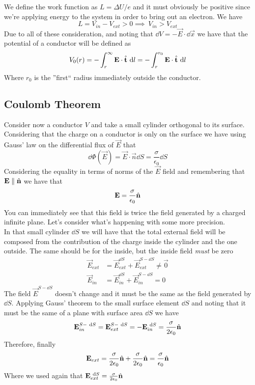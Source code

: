 \documentclass[../electromagnetism]{subfiles}
\begin{document}
We define the work function as $L=\Delta U/e$ and it must obviously be positive since we're applying energy to the system in order to bring out an electron. We have
\begin{equation}
	L=V_{in}-V_{ext}>0\implies\ V_{in}>V_{ext}
	\label{eq:potcond}
\end{equation}
Due to all of these consideration, and noting that $\dd V=-\vec{E}\cdot\dd\vec{x}$ we have that the potential of a conductor will be defined as
\begin{equation}
	V_0(r)=-\int_{r}^{\infty}\mathbf{E}\cdot\hat{\mathbf{t}}\ \mathrm{d} l=-\int_{r}^{r_0}\mathbf{E}\cdot\hat{\mathbf{t}}\ \mathrm{d} l
	\label{eq:potentialcond}
\end{equation}
Where $r_0$ is the ''first`` radius immediately outside the conductor.\\
\subsection{Coulomb Theorem}
Consider now a conductor $V$ and take a small cylinder orthogonal to its surface. Considering that the charge on a conductor is only on the surface we have using Gauss' law on the differential flux of $\vec{E}$ that
\begin{equation}
	\dd\Phi(\vec{E})=\vec{E}\cdot\vec{n}\dd S=\frac{\sigma}{\epsilon_0}\dd S
	\label{eq:glcondsur}
\end{equation}
Considering the equality in terms of norms of the $\vec{E}$ field and remembering that $\mathbf{E}\parallel\hat{\mathbf{n}}$ we have that
\begin{equation}
	\mathbf{E}=\frac{\sigma}{\epsilon_0}\hat{\mathbf{n}}
	\label{eq:fieldconductor}
\end{equation}
You can immediately see that this field is twice the field generated by a charged infinite plane. Let's consider what's happening with some more precision.\\
In that small cylinder $\dd S$ we will have that the total external field will be composed from the contribution of the charge inside the cylinder and the one outside. The same should be for the inside, but the inside field \textit{must} be zero
\begin{equation*}
	\begin{aligned}
		\vec{E}_{ext}&=\vec{E}_{ext}^{\dd S}+\vec{E}_{ext}^{S-\dd S}\ne\vec{0}\\
		\vec{E}_{in}&=\vec{E}_{in}^{\dd S}+\vec{E}_{in}^{S-\dd S}=0
	\end{aligned}
\end{equation*}
The field $\vec{E}^{S-\dd S}$ doesn't change and it must be the same as the field generated by $\dd S$. Applying Gauss' theorem to the small surface element $\dd S$ and noting that it must be the same of a plane with surface area $\dd S$ we have
\begin{equation*}
	\mathbf{E}_{in}^{S-\ \mathrm{d} S}=\mathbf{E}_{ext}^{S-\ \mathrm{d} S}=-\mathbf{E}_{in}^{\ \mathrm{d} S}=\frac{\sigma}{2\epsilon_0}\hat{\mathbf{n}}
\end{equation*}
Therefore, finally
\begin{equation*}
	\mathbf{E}_{ext}=\frac{\sigma}{2\epsilon_0}\hat{\mathbf{n}}+\frac{\sigma}{2\epsilon_0}\hat{\mathbf{n}}=\frac{\sigma}{\epsilon_0}\hat{\mathbf{n}}
\end{equation*}
Where we used again that $\mathbf{E}_{ext}^{\ \mathrm{d} S}=\frac{\sigma}{2\epsilon_0}\hat{\mathbf{n}}$
\end{document}
